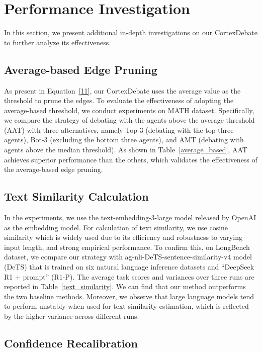 \section{Performance Investigation}
\label{pi}




In this section, we present additional in-depth investigations on our CortexDebate to further analyze its effectiveness.


\subsection{Average-based Edge Pruning}

As present in Equation~\eqref{11}, our CortexDebate uses the average value as the threshold to prune the edges. To evaluate the effectiveness of adopting the average-based threshold, we conduct experiments on MATH dataset. Specifically, we compare the strategy of debating with the agents above the average threshold (AAT) with three alternatives, namely Top-3 (debating with the top three agents), Bot-3 (excluding the bottom three agents), and AMT (debating with agents above the median threshold). As shown in Table~\ref{average_based}, AAT achieves superior performance than the others, which validates the effectiveness of the average-based edge pruning.


\subsection{Text Similarity Calculation}

In the experiments, we use the text-embedding-3-large model released by OpenAI as the embedding model. For calculation of text similarity, we use cosine similarity which is widely used due to its efficiency and robustness to varying input length, and strong empirical performance. To confirm this, on LongBench dataset, we compare our strategy with ag-nli-DeTS-sentence-similarity-v4 model (DeTS) that is trained on six natural language inference datasets and “DeepSeek R1 + prompt” (R1-P). The average task scores and variances over three runs are reported in Table~\ref{text_similarity}. We can find that our method outperforms the two baseline methods. Moreover, we observe that large language models tend to perform unstably when used for text similarity estimation, which is reflected by the higher variance across different runs.


\subsection{Confidence Recalibration}

